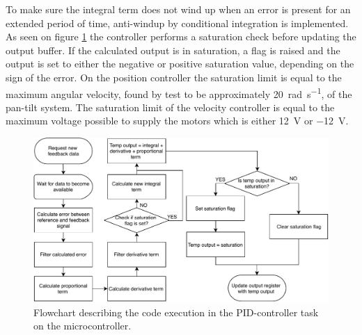 \documentclass[../../main.tex]{subfiles}
\begin{document}




To make sure the integral term does not wind up when an error is present for an extended period of time, anti-windup by conditional integration is implemented. As seen on figure \ref{fig:PIDControllerFlowchart} the controller performs a saturation check before updating the output buffer. If the calculated output is in saturation, a flag is raised and the output is set to either the negative or positive saturation value, depending on the sign of the error. On the position controller the saturation limit is equal to the maximum angular velocity, found by test to be approximately \SI{20}{\radian\per\second}, of the pan-tilt system. The saturation limit of the velocity controller is equal to the maximum voltage possible to supply the motors which is either \SI{12}{\volt} or \SI{-12}{\volt}.

\begin{figure}[H]
    \centering
    \includegraphics[width=\textwidth]{Sections/System_Implementation/Images/PIDControllerFlowchart.pdf}
    \caption{Flowchart describing the code execution in the PID-controller task on the microcontroller.}
    \label{fig:PIDControllerFlowchart}
\end{figure}
\end{document}
